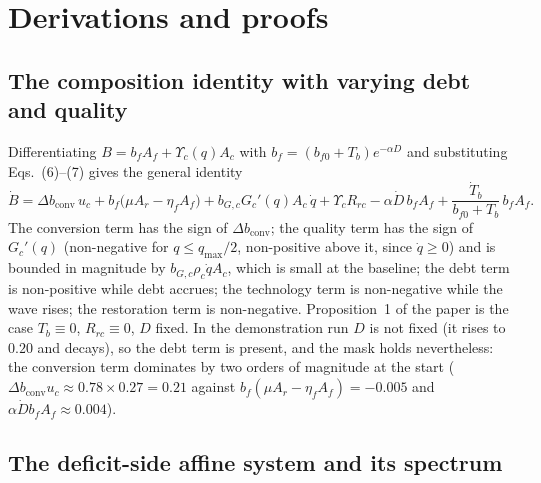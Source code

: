 \documentclass[11pt,a4paper]{article}
\newcommand{\dconv}{\Delta b_{\mathrm{conv}}}
\newcommand{\Ups}{\Upsilon_c}
\begin{document}
\section{Derivations and proofs}\label{si:proofs}

\subsection{The composition identity with varying debt and quality}\label{si:identity}

Differentiating $B=b_fA_f+\Ups(q)A_c$ with $b_f=(b_{f0}+T_b)e^{-\alpha D}$ and substituting Eqs.~(6)--(7) gives the general identity
\begin{equation}\label{eq:si_identity}
\dot B=\dconv\,u_c+b_f\big(\mu A_r-\eta_fA_f\big)+b_{G,c}G_c'(q)A_c\,\dot q+\Ups R_{rc}-\alpha\dot D\,b_fA_f+\frac{\dot T_b}{b_{f0}+T_b}\,b_fA_f .
\end{equation}
The conversion term has the sign of $\dconv$; the quality term has the sign of $G_c'(q)$ (non-negative for $q\le q_{\max}/2$, non-positive above it, since $\dot q\ge0$) and is bounded in magnitude by $b_{G,c}\rho_c\dot qA_c$, which is small at the baseline; the debt term is non-positive while debt accrues; the technology term is non-negative while the wave rises; the restoration term is non-negative. Proposition~1 of the paper is the case $T_b\equiv0$, $R_{rc}\equiv0$, $D$ fixed. In the demonstration run $D$ is not fixed (it rises to $0.20$ and decays), so the debt term is present, and the mask holds nevertheless: the conversion term dominates by two orders of magnitude at the start ($\dconv u_c\approx0.78\times0.27=0.21$ against $b_f(\mu A_r-\eta_fA_f)=-0.005$ and $\alpha\dot Db_fA_f\approx0.004$).

\subsection{The deficit-side affine system and its spectrum}\label{si:affine}
\end{document}
